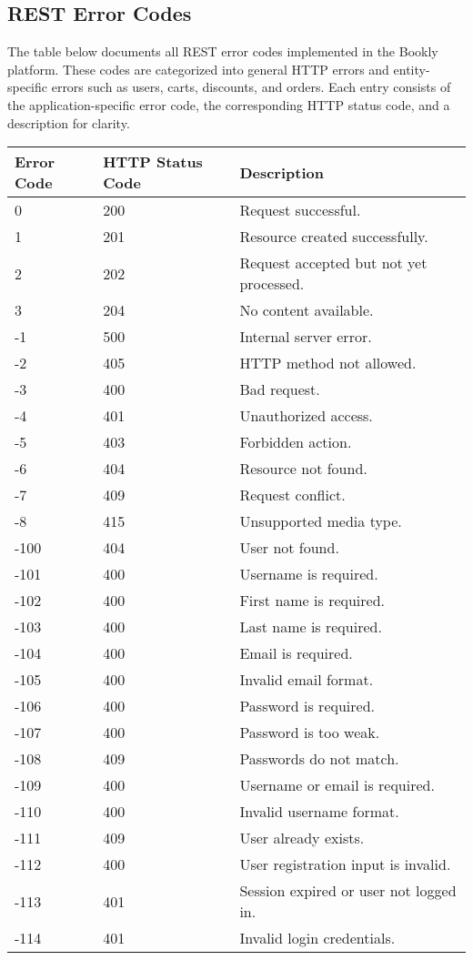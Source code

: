 \subsection{REST Error Codes}

The table below documents all REST error codes implemented in the Bookly platform. These codes are categorized into general HTTP errors and entity-specific errors such as users, carts, discounts, and orders. Each entry consists of the application-specific error code, the corresponding HTTP status code, and a description for clarity.

\begin{longtable}{|p{}|p{} |p{}|} 
\hline
\textbf{Error Code} & \textbf{HTTP Status Code} & \textbf{Description} \\
\hline

0 & 200 & Request successful. \\
\hline
1 & 201 & Resource created successfully. \\
\hline
2 & 202 & Request accepted but not yet processed. \\
\hline
3 & 204 & No content available. \\
\hline
-1 & 500 & Internal server error. \\
\hline
-2 & 405 & HTTP method not allowed. \\
\hline
-3 & 400 & Bad request. \\
\hline
-4 & 401 & Unauthorized access. \\
\hline
-5 & 403 & Forbidden action. \\
\hline
-6 & 404 & Resource not found. \\
\hline
-7 & 409 & Request conflict. \\
\hline
-8 & 415 & Unsupported media type. \\
\hline

-100 & 404 & User not found. \\
\hline
-101 & 400 & Username is required. \\
\hline
-102 & 400 & First name is required. \\
\hline
-103 & 400 & Last name is required. \\
\hline
-104 & 400 & Email is required. \\
\hline
-105 & 400 & Invalid email format. \\
\hline
-106 & 400 & Password is required. \\
\hline
-107 & 400 & Password is too weak. \\
\hline
-108 & 409 & Passwords do not match. \\
\hline
-109 & 400 & Username or email is required. \\
\hline
-110 & 400 & Invalid username format. \\
\hline
-111 & 409 & User already exists. \\
\hline
-112 & 400 & User registration input is invalid. \\
\hline
-113 & 401 & Session expired or user not logged in. \\
\hline
-114 & 401 & Invalid login credentials. \\
\hline


\end{longtable}
